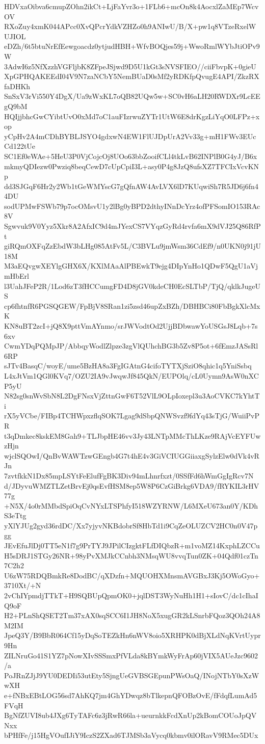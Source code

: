 HDVxaOibva6cmupZOhn2ikCt+LjFaYvr3o+1FLb6+mcOn8k4AocxlZaMEp7WcvOV
RXoZuy4xmK044APcc0XvQPcrYdkVZHZo0h9ANIwU/B/X+pw1q8VTzeRxelWUJIOL
eDZh/6t5btuNrEfEewgoacdz0ytjudHBH+WfvBOQjes59j+WwoRmlWYbJtiOPv9W
3AdwI6z5NfXzzhVGFljbK8ZFpeJSjwd9D5U1kGt3sNVSFIEO//ciiFbvpK+0gieU
XpGPHQAKEEdI04V9N7zaNCbY5NemBUaD0sMf2yRDKfpQvugE4API/ZkzRXfaDHKh
SnSxV3rVi550Y4DgX/Ua9zWxKL7oQB82UQw5w+SC0vH6aLH20RWDXr9LcEEgQ9bM
HQIjjbhcGwCYibtUvO0xMd7oC1auFIzrwuZYTr1UtW6E8drKgzLiYqO0LFPz+xop
yCpHv2A4mCDhBYBLJSYO4gdxwN4EW1FlUJDpUrA2Vv33g+mH1FWv3EUcCd122tUe
SC1Ef0eWAe+5HeU3P0VjCojcOj8UOo63bbZooifCLl4tkLvB62INPlB0G4yJ/B6x
mkmyQDIezw0Pwziq8beqCewD7cUpCpiI3L+asy0P4g8JzQ8ufsXZ7TFCIxVcvKNp
dd3SJGqF6Hr2y2Wb1tGeWMYscG7gQfnAW4AvLVX6lD7KUqwiSh7R5JD6j6fn44DU
sodUPMwFSWb79p7ocOMsvU1y2lBg0yBPD2dthyINnDcYrz4ofPFSomIO153RAc8V
Sgwvuk9V0Yyz5Xkr8A2AfxIC9d4mJYexCS7VYqzGyRd4rvfa6mX9dVJ25Q86RfPt
giRQmOXFqZzEbdW3bLHg085AtFv5L/C3BVLu9jmWsm36CdEf9/n0UKN0j91jU18M
M3aEQvgwXEYlgGHX6X/KXlMAaAlPBEwkT9ejg4DIpYnHo1QDwF5QgU1aVjmHbErl
l3UahJFeP2R/1Lod6zT3fHCCumgFD4D8jGV0kdeCH0EcSLTbP/TjQ/qklkJugeUS
cp6fhtnfR6PGSQGEW/FpBjV8SRan1zi5zsd46upZxBZh/DBHBCi80FbBgkXlcMxK
KN8uBT2zcI+jQ8X9pttVmAYnmo/srJWVodtOd2UjjBDbwawYoUSGsJ8Lqb+7s6xv
CwmYDqPQMpJP/AbbqyWodlZlpze3zgVlQUhchBG3b5Zv8P5ot+6fEmzJASsRl6RP
sJTv4BasqC/woyE/ume5BzHA8a3FgIGAtnG4cifoTYTXjSziO8qhic1q5YniSsbq
L4xJtVm1QGl0KVq7/OZU2IA9vJwqwJf845QkN/EUPOlq/cL0Uymn9AsW0nXCP5yU
N82sg0snWvSbN8L2DgFNsxVjZttnGwF6T52VlL9OLpIoxepl3u3AoCVKC7kYhtTi
rX5yVCbe/FIBp4TCHWpxzflqSOK7Lgag9dSbpQNWSvzf9fdYq43sTjG/WuiiPvPR
t3qDmkec8kskEM8Gah9+TLJbpHE46vv3Jy43LNTpMMcThLKze9RAjVcEYFUwzHjn
wjclSQOwI/QnBvWAWTzwGEngb4G7t4hE4v3GiVCIUGGiiaxgSylzElw0dVk4vRJn
7zvtfkkN1Dx85mpLSYtFeElufFgBK3Div94mLhnrfxzt/0SSfFd6hWmGgIgRcv7N
d/JDyvuWMZTLZetBrvEj0qsEvfHSM8ep5W8P6CzGiBrkg6VDA9/fRYKIL3rHV77g
+N5X/4o0rMMbdSpiOqCvNYxLTSPhfyI518WZYRNW/L6MXeU673an0Y/KDhS3eTtg
yXlYJUg2gyd36rdDC/Xx7yjyvNKBdobrSf8HbTd1i9CqZeOLUZCV2HC0n0V47pgg
JEvEfuJlDj0TT5eN1f7g9PrTYJ9JPilCIzgktFLfDIQbzR+m1voMZ14KxphLZCCu
H5sDRJ1STGy26NR+98yPvXMJkCCnbh3NMsqWU8vvqTun0ZK+04Qdf01czTn7C2h2
U6zW75RDQBmkRe8DodBC/qXDzfn+MQUOHXMnsmAVGBxJ3Kj5OWoGyo+3710Xt/+N
2vChIYpmdjTTkT+H9SQBUpQpmOK0+jqlDST3WyNuHh1H1+sIovC/dc1cIhaIQ9oF
H2+PLnShQSET2Tm37xAX0sqSCC6I1JH8NoX5xugGR2kLSnrbFQoz3QOh24A8M2IM
JpeQ3Y/B9BbR064Cf15yDqSoTEZkHn6nWV8oio5XRHPK0dBjXLdNqKVrtUypr9Hn
ZILNruGo41S1YZ7pNowXIvSSSmxPfVLda8kBYmkWyFrAp60jVIX5AUeJzc9602/a
PoJRnZJjJ9YU0DEDIi53utEty5SjngUeGVBSGEpunPWsOaQ/INojNTbY0sXzWwXH
e+fNBxEBtLOG56sd7AhKQ7jm4GhYDwqz8bTlkepnQFOBzOvE/fFdqfLumAd5FVqH
BgNfZUVI8ub4JXg6TyTAFc6z3jRwR66la+ueurnkkFcdXnUp2kBomCOUoJpQVNxx
bPHfFe/j15HgVOufIJiY9IczS2ZXad6TJMSb3aVycq0kbmv0ilORavV9RMec5DUx
